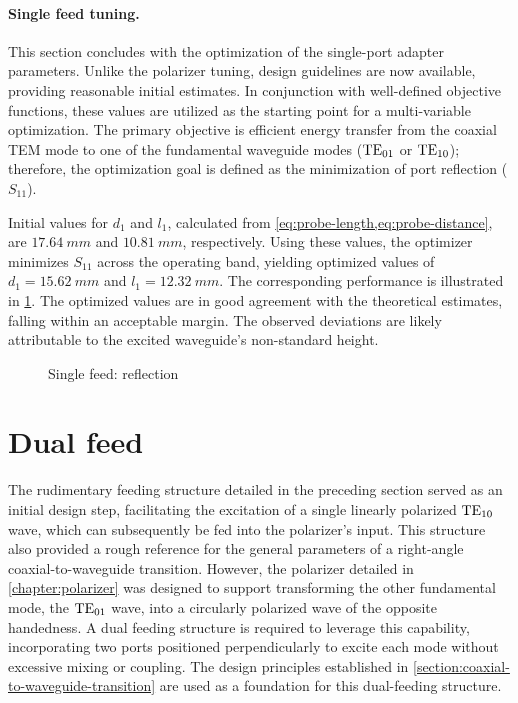 \documentclass[14pt,a4paper]{ntust_report}
\begin{document}
\paragraph{Single feed tuning.} This section concludes with the optimization of the single-port adapter parameters. Unlike the polarizer tuning, design guidelines are now available, providing reasonable initial estimates. In conjunction with well-defined objective functions, these values are utilized as the starting point for a multi-variable optimization. The primary objective is efficient energy transfer from the coaxial TEM mode to one of the fundamental waveguide modes ($\text{TE}_{01}$ or $\text{TE}_{10}$); therefore, the optimization goal is defined as the minimization of port reflection ($S_{11}$).

Initial values for $d_1$ and $l_1$, calculated from \cref{eq:probe-length,eq:probe-distance}, are $\qty{17.64}{mm}$ and $\qty{10.81}{mm}$, respectively. Using these values, the optimizer minimizes $S_{11}$ across the operating band, yielding optimized values of $d_1 = \qty{15.62}{mm}$ and $l_1 = \qty{12.32}{mm}$. The corresponding performance is illustrated in \cref{fig:single-feed-reflection}. The optimized values are in good agreement with the theoretical estimates, falling within an acceptable margin. The observed deviations are likely attributable to the excited waveguide's non-standard height.

\begin{figure}[!ht]
    \centering
    
    \caption{\label{fig:single-feed-reflection}Single feed: reflection}
\end{figure}

\section{Dual feed}
\label{section:dual-feed}
The rudimentary feeding structure detailed in the preceding section served as an initial design step, facilitating the excitation of a single linearly polarized $\text{TE}_{10}$ wave, which can subsequently be fed into the polarizer's input. This structure also provided a rough reference for the general parameters of a right-angle coaxial-to-waveguide transition. However, the polarizer detailed in \cref{chapter:polarizer} was designed to support transforming the other fundamental mode, the $\text{TE}_{01}$ wave, into a circularly polarized wave of the opposite handedness. A dual feeding structure is required to leverage this capability, incorporating two ports positioned perpendicularly to excite each mode without excessive mixing or coupling. The design principles established in \cref{section:coaxial-to-waveguide-transition} are used as a foundation for this dual-feeding structure.
\end{document}
